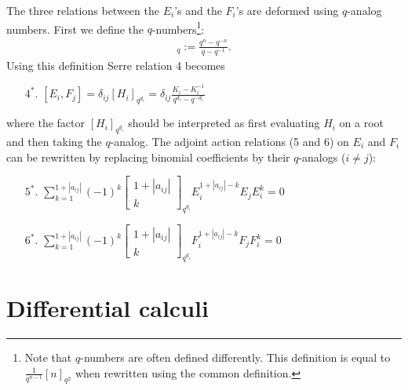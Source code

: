 \begin{construct}
        The three relations between the $E_i$'s and the $F_i$'s are deformed using $q$-analog numbers. First we define the $q$-numbers\footnote{Note that $q$-numbers are often defined differently. This definition is equal to $\frac{1}{q^{n-1}}[n]_{q^2}$ when rewritten using the common definition.}:
        \begin{gather}
            [n]_q := \frac{q^n - q^{-n}}{q - q^{-1}}.
        \end{gather}
        Using this definition Serre relation 4 becomes
        \begin{enumerate}
            \item[$4^*.$] $[E_i, F_j] = \delta_{ij}[H_i]_{q^{d_i}} = \delta_{ij}\frac{K_i - K_i^{-1}}{q^{d_i} - q^{-d_i}}$
        \end{enumerate}
        where the factor $[H_i]_{q^{d_i}}$ should be interpreted as first evaluating $H_i$ on a root and then taking the $q$-analog. The adjoint action relations (5 and 6) on $E_i$ and $F_i$ can be rewritten by replacing binomial coefficients by their $q$-analogs ($i\neq j$):
        \begin{enumerate}
            \item[$5^*.$] $\sum_{k=1}^{1+|a_{ij}|} (-1)^k\begin{bmatrix}1+|a_{ij}|\\k\end{bmatrix}_{q^{d_i}}E_i^{1+|a_{ij}|-k}E_jE_i^k = 0$
            \item[$6^*.$] $\sum_{k=1}^{1+|a_{ij}|} (-1)^k\begin{bmatrix}1+|a_{ij}|\\k\end{bmatrix}_{q^{d_i}}F_i^{1+|a_{ij}|-k}F_jF_i^k = 0$
        \end{enumerate}
    \end{construct}

\section{Differential calculi}

